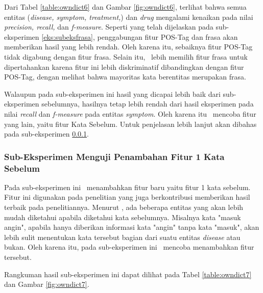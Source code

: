 	Dari Tabel \ref{table:owndict6} dan Gambar \ref{fig:owndict6}, terlihat bahwa semua entitas (\textit{disease, symptom, treatment,}) dan \textit{drug} mengalami kenaikan pada nilai \textit{precision, recall,} dan \textit{f-measure}. Seperti yang telah dijelaskan pada sub-eksperimen \ref{eks:subeksfrasa}, penggabungan fitur POS-Tag dan frasa akan memberikan hasil yang lebih rendah. Oleh karena itu, sebaiknya fitur POS-Tag tidak digabung dengan fitur frasa. Selain itu, \saya~lebih memilih fitur frasa untuk dipertahankan karena fitur ini lebih diskriminatif dibandingkan dengan fitur POS-Tag, dengan melihat bahwa mayoritas kata berentitas merupakan frasa.
	
	Walaupun pada sub-eksperimen ini hasil yang dicapai lebih baik dari sub-eksperimen sebelumnya, hasilnya tetap lebih rendah dari hasil eksperimen \cite{skripsiKakRadit} pada nilai \textit{recall} dan \textit{f-measure} pada entitas \textit{symptom}. Oleh karena itu \saya~mencoba fitur yang lain, yaitu fitur Kata Sebelum. Untuk penjelasan lebih lanjut akan dibahas pada sub-eksperimen \ref{eks:subekswbef1}.
	
	\subsubsection{Sub-Eksperimen Menguji Penambahan Fitur 1 Kata Sebelum}\label{eks:subekswbef1}
	Pada sub-eksperimen ini \saya~menambahkan fitur baru yaitu fitur 1 kata sebelum. Fitur ini digunakan pada penelitian \cite{skripsiKakRadit} yang juga berkontribusi memberikan hasil terbaik pada penelitiannya. Menurut \saya, ada beberapa entitas yang akan lebih mudah diketahui apabila diketahui kata sebelumnya. Misalnya kata "masuk angin", apabila hanya diberikan informasi kata "angin" tanpa kata "masuk", akan lebih sulit menentukan kata tersebut bagian dari suatu entitas \textit{disease} atau bukan. Oleh karena itu, pada sub-eksperimen ini \saya~mencoba menambahkan fitur tersebut.
	
	Rangkuman hasil sub-eksperimen ini dapat dilihat pada Tabel \ref{table:owndict7} dan Gambar \ref{fig:owndict7}.
	
